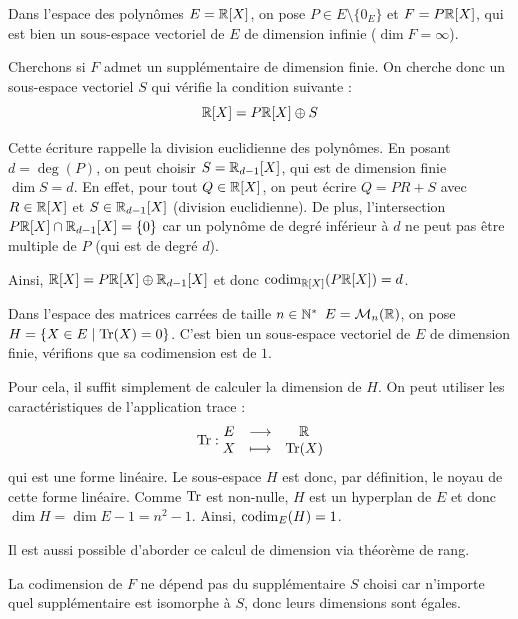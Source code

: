 \documentclass[11pt,a4paper]{report}
\begin{document}
\begin{example}
    Dans l'espace des polynômes $E = \mathbb{R}[X]$, on pose $P \in E\setminus\{0_E\}$ et $F = P\mathbb{R}[X]$, qui est bien un sous-espace vectoriel de $E$ de dimension infinie ($\dim F = \infty$).

    Cherchons si $F$ admet un supplémentaire de dimension finie. On cherche donc un sous-espace vectoriel $S$ qui vérifie la condition suivante :
    $$\mathbb{R}[X] = P\mathbb{R}[X] \oplus S$$

    Cette écriture rappelle la division euclidienne des polynômes. En posant $d = \deg(P)$, on peut choisir $S = \mathbb{R}_{d-1}[X]$, qui est de dimension finie $\dim S = d$. En effet, pour tout $Q \in \mathbb{R}[X]$, on peut écrire $Q = P R + S$ avec $R \in \mathbb{R}[X]$ et $S \in \mathbb{R}_{d-1}[X]$ (division euclidienne). De plus, l'intersection $P\mathbb{R}[X] \cap \mathbb{R}_{d-1}[X] = \{0\}$ car un polynôme de degré inférieur à $d$ ne peut pas être multiple de $P$ (qui est de degré $d$).
    
    Ainsi, $\mathbb{R}[X] = P\mathbb{R}[X] \oplus \mathbb{R}_{d-1}[X]$ et donc $\mathrm{codim}_{\mathbb{R}[X]}(P\mathbb{R}[X]) = d$.
\end{example}

\begin{example}
    Dans l'espace des matrices carrées de taille $n \in \mathbb{N}^*$ $E = \mathcal M_n(\mathbb{R})$, on pose $H = \{X \in E \mid \mathrm{Tr}(X) = 0\}$. C'est bien un sous-espace vectoriel de $E$ de dimension finie, vérifions que sa codimension est de $1$.

    Pour cela, il suffit simplement de calculer la dimension de $H$. On peut utiliser les caractéristiques de l'application trace :
    $$\mathrm{Tr} : \begin{matrix} E & \longrightarrow & \mathbb{R} \\ X & \longmapsto & \mathrm{Tr}(X) \end{matrix}$$
    qui est une forme linéaire. Le sous-espace $H$ est donc, par définition, le noyau de cette forme linéaire. Comme $\mathrm{Tr}$ est non-nulle, $H$ est un hyperplan de $E$ et donc $\dim H = \dim E - 1 = n^2 - 1$. Ainsi, $\mathrm{codim}_E(H) = 1$.

    Il est aussi possible d'aborder ce calcul de dimension via théorème de rang.
\end{example}

\begin{remark}
    La codimension de $F$ ne dépend pas du supplémentaire $S$ choisi car n'importe quel supplémentaire est isomorphe à $S$, donc leurs dimensions sont égales.
\end{remark}
\end{document}
